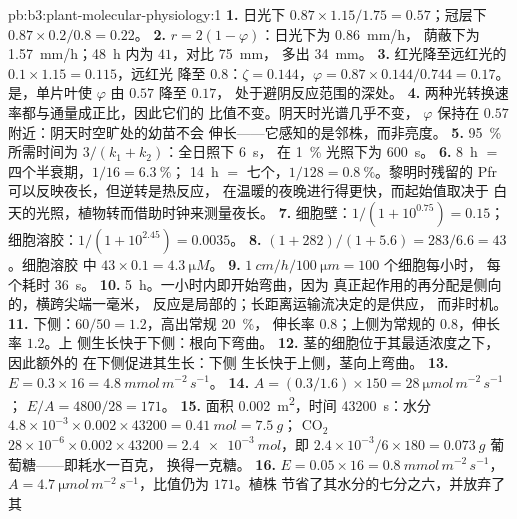 \begin{solution}{pb:b3:plant-molecular-physiology:1}
\textbf{1.} 日光下 $0.87\times 1.15/1.75 = 0.57$；冠层下 $0.87\times
0.2/0.8 = 0.22$。
\textbf{2.} $r = 2(1 - \varphi)$：日光下为 \qty{0.86}{mm/h}，
荫蔽下为 \qty{1.57}{mm/h}；\qty{48}{h} 内为 $41$，对比 \qty{75}{mm}，
多出 \qty{34}{mm}。
\textbf{3.} 红光降至远红光的 $0.1\times 1.15 = 0.115$，远红光
降至 $0.8$：$\zeta = 0.144$，$\varphi = 0.87\times 0.144/0.744 =
0.17$。是，单片叶使 $\varphi$ 由 $0.57$ 降至 $0.17$，
处于避阴反应范围的深处。
\textbf{4.} 两种光转换速率都与通量成正比，因此它们的
比值不变。阴天时光谱几乎不变，
$\varphi$ 保持在 $0.57$ 附近：阴天时空旷处的幼苗不会
伸长——它感知的是邻株，而非亮度。
\textbf{5.} \qty{95}{\%} 所需时间为 $3/(k_{1} + k_{2})$：全日照下 \qty{6}{s}，
在 \qty{1}{\%} 光照下为 \qty{600}{s}。
\textbf{6.} \qty{8}{h} $=$ 四个半衰期，$1/16 = \qty{6.3}{\%}$；
\qty{14}{h} $=$ 七个，$1/128 = \qty{0.8}{\%}$。黎明时残留的 Pfr
可以反映夜长，但逆转是热反应，
在温暖的夜晚进行得更快，而起始值取决于
白天的光照，植物转而借助时钟来测量夜长。
\textbf{7.} 细胞壁：$1/(1 + 10^{0.75}) = 0.15$；细胞溶胶：$1/(1 +
10^{2.45}) = 0.0035$。
\textbf{8.} $(1 + 282)/(1 + 5.6) = 283/6.6 = 43$。细胞溶胶
中 $43\times 0.1 = \qty{4.3}{\micro M}$。
\textbf{9.} $\qty{1}{cm/h}/\qty{100}{\micro m} = 100$ 个细胞每小时，
每个耗时 \qty{36}{s}。
\textbf{10.} \qty{5}{h}。一小时内即开始弯曲，因为
真正起作用的再分配是侧向的，横跨尖端一毫米，
反应是局部的；长距离运输流决定的是供应，
而非时机。
\textbf{11.} 下侧：$60/50 = 1.2$，高出常规 \qty{20}{\%}，
伸长率 $0.8$；上侧为常规的 $0.8$，伸长率 $1.2$。上
侧生长快于下侧：根向下弯曲。
\textbf{12.} 茎的细胞位于其最适浓度之下，因此额外的
在下侧促进其生长：下侧
生长快于上侧，茎向上弯曲。
\textbf{13.} $E = 0.3\times 16 = \qty{4.8}{mmol\,m^{-2}\,s^{-1}}$。
\textbf{14.} $A = (0.3/1.6)\times 150 = \qty{28}{\micro mol\,m^{-2}\,s^{-1}}$；
$E/A = 4800/28 = 171$。
\textbf{15.} 面积 \qty{0.002}{m^2}，时间 \num{43200}~s：水分 $4.8\times
10^{-3}\times 0.002\times\num{43200} = \qty{0.41}{mol} = \qty{7.5}{g}$；
CO$_{2}$ $28\times 10^{-6}\times 0.002\times\num{43200} =
\qty{2.4e-3}{mol}$，即 $2.4\times 10^{-3}/6\times 180 =
\qty{0.073}{g}$ 葡萄糖——即耗水一百克，
换得一克糖。
\textbf{16.} $E = 0.05\times 16 = \qty{0.8}{mmol\,m^{-2}\,s^{-1}}$，
$A = \qty{4.7}{\micro mol\,m^{-2}\,s^{-1}}$，比值仍为 $171$。植株
节省了其水分的七分之六，并放弃了其

\end{solution}
